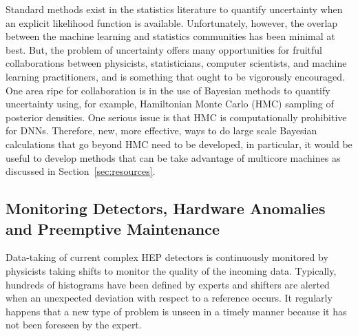Standard methods exist in the statistics literature to quantify uncertainty when an explicit likelihood function is available. Unfortunately, however, the overlap between the machine learning and statistics communities has been minimal at best.
But, the problem of uncertainty offers many opportunities for fruitful collaborations between physicists, statisticians, computer scientists, and machine learning practitioners, and is something that ought to be vigorously encouraged.
One area ripe for collaboration is in the use of Bayesian methods to quantify uncertainty using, for example, Hamiltonian Monte Carlo (HMC) sampling of posterior densities. One serious issue is that HMC is computationally prohibitive for DNNs. Therefore, new, more effective, ways to do large scale Bayesian calculations that go beyond HMC need to be developed, in particular, it would be useful to develop methods that can be take advantage of multicore machines as discussed in Section~\ref{sec:resources}.






\subsection{Monitoring Detectors, Hardware Anomalies and Preemptive Maintenance}
\label{sec:applications-monitoring}
Data-taking of current complex HEP detectors is continuously monitored by physicists taking shifts to monitor the quality of the incoming data. Typically, hundreds of histograms have been defined by experts and shifters are alerted when an unexpected deviation with respect to a reference occurs. It regularly happens that a new type of problem is unseen in a timely manner because it has not been foreseen by the expert.

